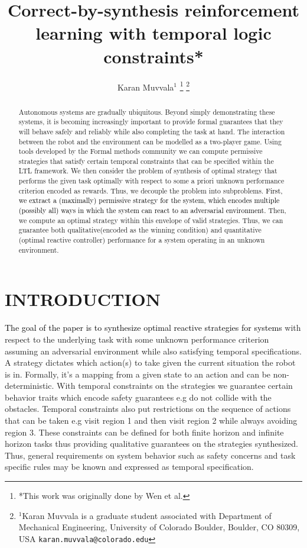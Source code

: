 \documentclass[letterpaper, 10 pt, conference]{ieeeconf}  %
\title{\LARGE \bf
Correct-by-synthesis reinforcement learning with temporal logic constraints*
}
\author{Karan Muvvala$^{1}$ %
\thanks{*This work was originally done by Wen et al.\cite{c1}}%
\thanks{$^{1}$Karan Muvvala is a graduate student associated with Department of Mechanical Engineering,
        University of Colorado Boulder, Boulder, CO 80309, USA
        {\tt\small karan.muvvala@colorado.edu}}%
}
\begin{document}
\maketitle
\thispagestyle{empty}
\pagestyle{empty}


\begin{abstract}

Autonomous systems are gradually ubiquitous. Beyond simply demonstrating these systems, it is becoming increasingly important to provide formal guarantees that they will behave safely and reliably while also completing the task at hand. The interaction between the robot and the environment can be modelled as a two-player game. Using tools developed by the Formal methods community we can compute permissive strategies that satisfy certain temporal constraints that can be specified within the LTL framework. We then consider the problem of synthesis of optimal strategy that performs the given task optimally with respect to some a priori unknown performance criterion encoded as rewards. Thus, we decouple the problem into subproblems. \textcolor{black}{First, we extract a (maximally) permissive strategy for the system, which encodes multiple (possibly all) ways in which the system can react to an adversarial environment.}  Then, we compute an optimal strategy within this envelope of valid strategies. Thus, we can guarantee both qualitative(encoded as the winning condition) and quantitative (optimal reactive controller) performance for a system operating in an unknown environment. 


\end{abstract}


\section{INTRODUCTION}

\textcolor{black} {The goal of the paper is to synthesize optimal reactive strategies for systems} with respect to the underlying task with some unknown performance criterion  assuming an adversarial environment while also satisfying temporal specifications. A strategy dictates which action(s) to take given the current situation the robot is in. Formally, it's a mapping from a given state to an action and can be non-deterministic. With temporal constraints on the strategies we guarantee certain behavior traits which encode safety guarantees e.g do not collide with the obstacles. Temporal constraints also put restrictions on the sequence of actions that can be taken e.g visit region 1 and then visit region 2 while always avoiding region 3. These constraints can be defined for both finite horizon and infinite horizon tasks thus providing qualitative guarantees on the strategies synthesized. Thus, general requirements on system behavior such as safety concerns and task specific rules may be known and expressed as temporal specification.\\
\end{document}
